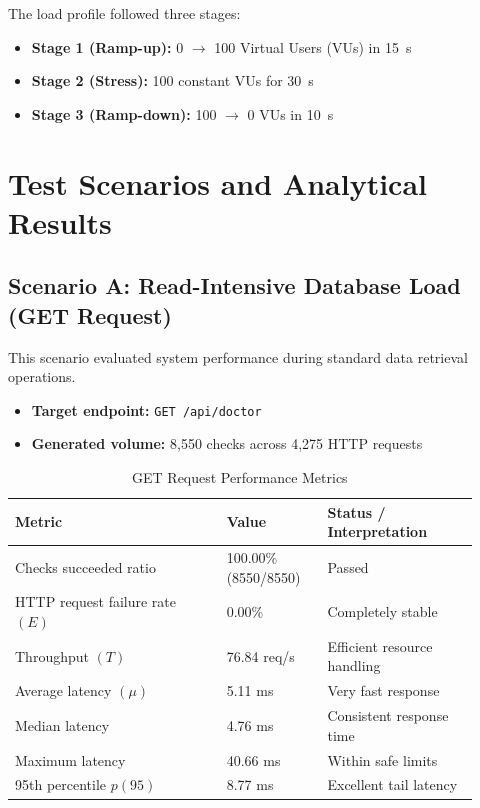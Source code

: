 \documentclass[12pt,a4paper]{article}
\begin{document}
The load profile followed three stages:

\begin{itemize}[leftmargin=1.5em]
    \item \textbf{Stage 1 (Ramp-up):} 0 $\rightarrow$ 100 Virtual Users (VUs) in \SI{15}{s}
    \item \textbf{Stage 2 (Stress):} 100 constant VUs for \SI{30}{s}
    \item \textbf{Stage 3 (Ramp-down):} 100 $\rightarrow$ 0 VUs in \SI{10}{s}
\end{itemize}

\section{Test Scenarios and Analytical Results}

\subsection{Scenario A: Read-Intensive Database Load (GET Request)}

This scenario evaluated system performance during standard data retrieval operations.

\begin{itemize}[leftmargin=1.5em]
    \item \textbf{Target endpoint:} \texttt{GET /api/doctor}
    \item \textbf{Generated volume:} 8,550 checks across 4,275 HTTP requests
\end{itemize}

\begin{table}[h!]
\centering
\caption{GET Request Performance Metrics}
\begin{tabular}{p{0.42\linewidth} p{0.20\linewidth} p{0.30\linewidth}}
\toprule
\textbf{Metric} & \textbf{Value} & \textbf{Status / Interpretation} \\
\midrule
Checks succeeded ratio & 100.00\% (8550/8550) & Passed \\
HTTP request failure rate $(E)$ & 0.00\% & Completely stable \\
Throughput $(T)$ & 76.84 req/s & Efficient resource handling \\
Average latency $(\mu)$ & 5.11 ms & Very fast response \\
Median latency & 4.76 ms & Consistent response time \\
Maximum latency & 40.66 ms & Within safe limits \\
95th percentile $p(95)$ & 8.77 ms & Excellent tail latency \\
\bottomrule
\end{tabular}
\end{table}
\end{document}
